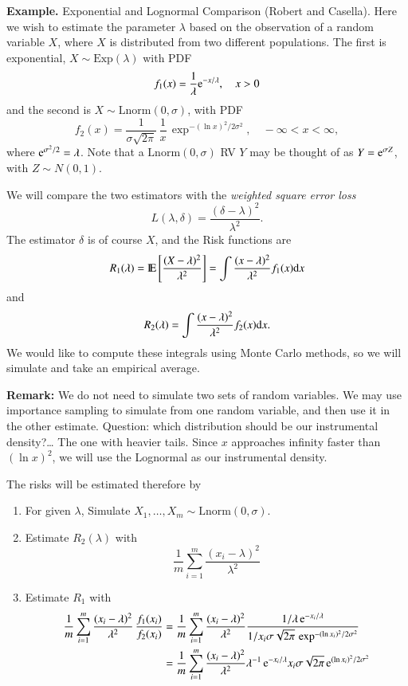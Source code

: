 \documentclass[11pt,english]{scrbook}
\begin{document}
\textbf{Example.} Exponential and Lognormal Comparison (Robert and Casella). Here we wish to estimate the parameter \(\lambda\) based on the observation of a random variable \(X\), where \(X\) is distributed from two different populations. The first is exponential, \(X\sim\mathrm{Exp}(\lambda)\) with PDF 
\[
f_{1}(x)=\frac{1}{\lambda}\mathrm{e}^{-x/\lambda},\quad x>0
\]
 and the second is \(X\sim\mathrm{Lnorm}(0,\sigma)\), with PDF
\[
f_{2}(x)=\frac{1}{\sigma\sqrt{2\pi}}\,\frac{1}{x}\,\exp^{-(\ln x)^{2}/2\sigma^{2}},\quad-\infty<x<\infty,
\]
where \(\mathrm{e}^{\sigma^{2}/2}=\lambda\). Note that a \(\mathrm{Lnorm}(0,\sigma)\) RV \(Y\) may be thought of as \(Y=\mathrm{e}^{\sigma Z}\), with \(Z \sim N(0,1)\).

We will compare the two estimators with the \emph{weighted square error loss} 
\[
L(\lambda,\delta)=\frac{(\delta-\lambda)^{2}}{\lambda^{2}}.
\]
The estimator \(\delta\) is of course \(X\), and the Risk functions are 
\[
R_{1}(\lambda)=\mathrm{I\hspace{-1.5pt}E}\left[\frac{(X-\lambda)^{2}}{\lambda^{2}}\right]=\int\frac{(x-\lambda)^{2}}{\lambda^{2}}f_{1}(x)\mathrm{d} x
\]
and 
\[
R_{2}(\lambda)=\int\frac{(x - \lambda)^{2}}{\lambda^{2}}f_{2}(x)\mathrm{d} x.
\]
We would like to compute these integrals using Monte Carlo methods, so we will simulate and take an empirical average.  

\textbf{Remark:}  We do not need to simulate two sets of random variables. We may use importance sampling to simulate from one random variable, and then use it in the other estimate. Question: which distribution should be our instrumental density?\ldots{} The one with heavier tails. Since \(x\) approaches infinity faster than \((\ln x)^{2}\), we will use the Lognormal as our instrumental density.

The risks will be estimated therefore by
\begin{enumerate}
\item For given \(\lambda\), Simulate \(X_{1},\ldots,X_{m} \sim \mathrm{Lnorm}(0,\sigma)\).
\item Estimate \(R_{2}(\lambda)\) with 
\[
   \frac{1}{m}\sum_{i=1}^{m}\frac{(x_{i}-\lambda)^{2}}{\lambda^{2}}
   \]
\item Estimate \(R_{1}\) with 
  \begin{align*}
  \frac{1}{m}\sum_{i=1}^{m}\frac{(x_{i}-\lambda)^{2}}{\lambda^{2}}\,\frac{f_{1}(x_{i})}{f_{2}(x_{i})} & =\frac{1}{m}\sum_{i=1}^{m}\frac{(x_{i}-\lambda)^{2}}{\lambda^{2}}\frac{1/\lambda\, \mathrm{e}^{-x_{i}/\lambda}}{1/x_{i}\sigma\sqrt{2\pi}\,\exp^{-(\ln x_{i})^{2}/2\sigma^{2}}}\\
& =\frac{1}{m}\sum_{i=1}^{m}\frac{(x_{i}-\lambda)^{2}}{\lambda^{2}}\lambda^{-1}\, \mathrm{e}^{-x_{i}/\lambda}x_{i}\sigma\sqrt{2\pi}\, \mathrm{e}^{(\ln x_{i})^{2}/2\sigma^{2}}
  \end{align*}
\end{enumerate}
\end{document}
